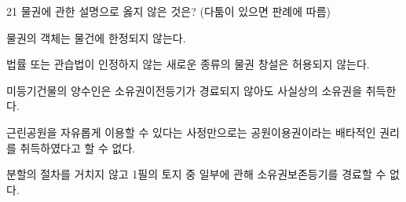 \begin{question}{21}
물권에 관한 설명으로 옳지 않은 것은? (다툼이 있으면 판례에 따름)
\begin{choices}
  \item 물권의 객체는 물건에 한정되지 않는다.
  \item 법률 또는 관습법이 인정하지 않는 새로운 종류의 물권 창설은 허용되지 않는다.
  \item 미등기건물의 양수인은 소유권이전등기가 경료되지 않아도 사실상의 소유권을 취득한다.
  \item 근린공원을 자유롭게 이용할 수 있다는 사정만으로는 공원이용권이라는 배타적인 권리를 취득하였다고 할 수 없다.
  \item 분할의 절차를 거치지 않고 1필의 토지 중 일부에 관해 소유권보존등기를 경료할 수 없다.
\end{choices}
\end{question}
